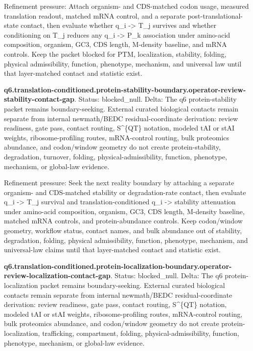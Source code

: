 Refinement pressure: Attach organism- and CDS-matched codon usage, measured translation readout, matched mRNA control, and a separate post-translational-state contact, then evaluate whether q\_i -> T\_j survives and whether conditioning on T\_j reduces any q\_i -> P\_k association under amino-acid composition, organism, GC3, CDS length, M-density baseline, and mRNA controls. Keep the packet blocked for PTM, localization, stability, folding, physical admissibility, function, phenotype, mechanism, and universal law until that layer-matched contact and statistic exist.

\textbf{q6.translation-conditioned.protein-stability-boundary.operator-review-stability-contact-gap}. Status: blocked\_null. Delta: The q6 protein-stability packet remains boundary-seeking. External curated biological contacts remain separate from internal newmath/BEDC residual-coordinate derivation: review readiness, gate pass, contact routing, S\textasciicircum{}\{QT\} notation, modeled tAI or stAI weights, ribosome-profiling routes, mRNA-control routing, bulk proteomics abundance, and codon/window geometry do not create protein-stability, degradation, turnover, folding, physical-admissibility, function, phenotype, mechanism, or global-law evidence.

Refinement pressure: Seek the next reality boundary by attaching a separate organism- and CDS-matched stability or degradation-rate contact, then evaluate q\_i -> T\_j survival and translation-conditioned q\_i -> stability attenuation under amino-acid composition, organism, GC3, CDS length, M-density baseline, matched mRNA controls, and protein-abundance controls. Keep codon/window geometry, workflow status, contact names, and bulk abundance out of stability, degradation, folding, physical admissibility, function, phenotype, mechanism, and universal-law claims until that layer-matched contact and statistic exist.

\textbf{q6.translation-conditioned.protein-localization-boundary.operator-review-localization-contact-gap}. Status: blocked\_null. Delta: The q6 protein-localization packet remains boundary-seeking. External curated biological contacts remain separate from internal newmath/BEDC residual-coordinate derivation: review readiness, gate pass, contact routing, S\textasciicircum{}\{QT\} notation, modeled tAI or stAI weights, ribosome-profiling routes, mRNA-control routing, bulk proteomics abundance, and codon/window geometry do not create protein-localization, trafficking, compartment, folding, physical-admissibility, function, phenotype, mechanism, or global-law evidence.

